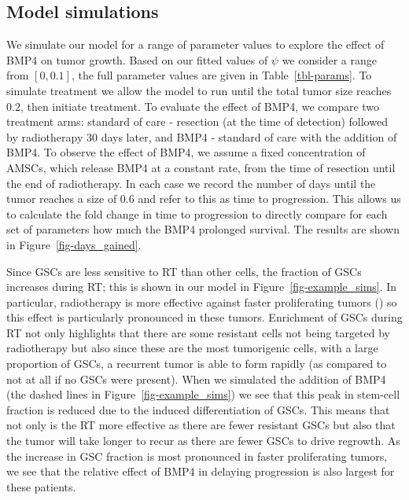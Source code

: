 \documentclass[
  letterpaper,
]{scrreprt}
\theoremstyle{definition}
\theoremstyle{remark}
\begin{document}
\subsection{Model simulations}\label{sec-model-sims}

We simulate our model for a range of parameter values to explore the
effect of BMP4 on tumor growth. Based on our fitted values of \(\psi\)
we consider a range from \([0,0.1]\), the full parameter values are
given in Table~\ref{tbl-params}. To simulate treatment we allow the
model to run until the total tumor size reaches \(0.2\), then initiate
treatment. To evaluate the effect of BMP4, we compare two treatment
arms: standard of care - resection (at the time of detection) followed
by radiotherapy 30 days later, and BMP4 - standard of care with the
addition of BMP4. To observe the effect of BMP4, we assume a fixed
concentration of AMSCs, which release BMP4 at a constant rate, from the
time of resection until the end of radiotherapy. In each case we record
the number of days until the tumor reaches a size of \(0.6\) and refer
to this as time to progression. This allows us to calculate the fold
change in time to progression to directly compare for each set of
parameters how much the BMP4 prolonged survival. The results are shown
in Figure~\ref{fig-days_gained}.

Since GSCs are less sensitive to RT than other cells, the fraction of
GSCs increases during RT; this is shown in our model in
Figure~\ref{fig-example_sims}. In particular, radiotherapy is more
effective against faster proliferating tumors
() so this effect is
particularly pronounced in these tumors. Enrichment of GSCs during RT
not only highlights that there are some resistant cells not being
targeted by radiotherapy but also since these are the most tumorigenic
cells, with a large proportion of GSCs, a recurrent tumor is able to
form rapidly (as compared to not at all if no GSCs were present). When
we simulated the addition of BMP4 (the dashed lines in
Figure~\ref{fig-example_sims}) we see that this peak in stem-cell
fraction is reduced due to the induced differentiation of GSCs. This
means that not only is the RT more effective as there are fewer
resistant GSCs but also that the tumor will take longer to recur as
there are fewer GSCs to drive regrowth. As the increase in GSC fraction
is most pronounced in faster proliferating tumors, we see that the
relative effect of BMP4 in delaying progression is also largest for
these patients.
\end{document}
